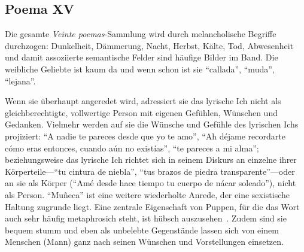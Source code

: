 \subsection{Poema XV}
Die gesamte \textit{Veinte poemas}-Sammlung wird durch melancholische Begriffe durchzogen:
Dunkelheit, Dämmerung, Nacht, Herbst, Kälte, Tod, Abwesenheit und damit assoziierte semantische Felder sind häufige Bilder im Band.
Die weibliche Geliebte ist kaum da und wenn schon ist sie ``callada'', ``muda'', ``lejana''.

Wenn sie überhaupt angeredet wird, adressiert sie das lyrische Ich nicht als gleichberechtigte, vollwertige Person mit eigenen Gefühlen, Wünschen und Gedanken.
Vielmehr werden auf sie die Wünsche und Gefühle des lyrischen Ichs projiziert:
``A nadie te pareces desde que yo te amo'', ``Ah déjame recordarte cómo eras entonces, cuando aún no existías'', ``te pareces a mi alma'';
beziehungsweise das lyrische Ich richtet sich in seinem Diskurs an einzelne ihrer Körperteile—``tu cintura de niebla'', ``tus brazos de piedra transparente''—oder an sie als Körper (``Amé desde hace tiempo tu cuerpo de nácar soleado''), nicht als Person. %
``Muñeca'' ist eine weitere wiederholte Anrede, der eine sexistische Haltung zugrunde liegt.
Eine zentrale Eigenschaft von Puppen, für die das Wort auch sehr häufig metaphrosich steht, ist hübsch auszusehen~\cite{Walter2010}. %
Zudem sind sie bequem stumm und eben als unbelebte Gegenstände lassen sich von einem Menschen (Mann) ganz nach seinen Wünschen und Vorstellungen einsetzen. %

